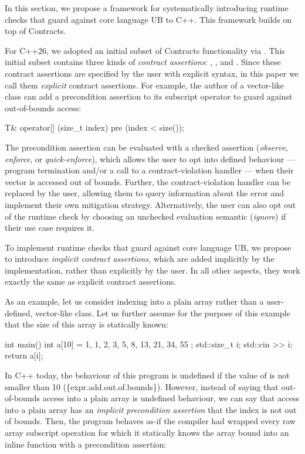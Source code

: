 In this section, we propose a framework for systematically introducing runtime checks that guard against core language UB to C++. This framework builds on top of Contracts.

For C++26, we adopted an initial subset of Contracts functionality via \cite{P2900R14}. This initial subset contains three kinds of \emph{contract assertions}: , , and . Since these contract assertions are specified by the user with explicit syntax, in this paper we call them \emph{explicit} contract assertions. For example, the author of a vector-like class can add a precondition assertion to its subscript operator to guard against out-of-bounds access:

\begin{codeblock}
T& operator[] (size_t index)
  pre (index < size());
\end{codeblock}

The precondition assertion  can be evaluated with a checked assertion  (\emph{observe}, \emph{enforce}, or \emph{quick-enforce}), which allows the user to opt into defined behaviour --- program termination and/or a call to a contract-violation handler --- when their vector is accessed out of bounds. Further, the contract-violation handler can be replaced by the user, allowing them to query information about the error and implement their own mitigation strategy. Alternatively, the user can also opt out of the runtime check by choosing an unchecked evaluation semantic (\emph{ignore}) if their use case requires it.

To implement runtime checks that guard against core language UB, we propose to introduce \emph{implicit contract assertions}, which are added implicitly by the implementation, rather than explicitly by the user. In all other aspects, they work exactly the same as explicit contract assertions.

As an example, let us consider indexing into a plain array rather than a user-defined, vector-like class. Let us further assume for the purpose of this example that the size  of this array is statically known:

\begin{codeblock}
int main() {
  int a[10] = { 1, 1, 2, 3, 5, 8, 13, 21, 34, 55 };
  std::size_t i; 
  std::cin >> i;
  return a[i];
}
\end{codeblock}

In C++ today, the behaviour of this program is undefined if the value of  is not smaller than 10 (\{expr.add.out.of.bounds\}). However, instead of saying that out-of-bounds access into a plain array is undefined behaviour, we can say that access into a plain array has an \emph{implicit precondition assertion} that the index is not out of bounds. Then, the program behaves as-if the compiler had wrapped every raw array subscript operation for which it statically knows the array bound  into an inline function with a precondition assertion:

